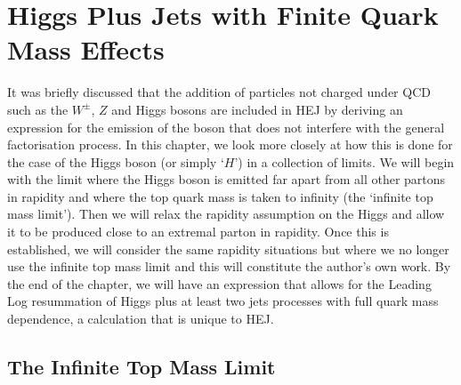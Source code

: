\chapter{Higgs Plus Jets with Finite Quark Mass Effects}


It was briefly discussed that the addition of particles not charged under QCD such as the $W^\pm$, $Z$ and Higgs bosons are included in HEJ by deriving an expression for the emission of the boson that does not interfere with the general factorisation process. In this chapter, we look more closely at how this is done for the case of the Higgs boson (or simply `$H$') in a collection of limits. We will begin with the limit where the Higgs boson is emitted far apart from all other partons in rapidity and where the top quark mass is taken to infinity (the `infinite top mass limit'). Then we will relax the rapidity assumption on the Higgs and allow it to be produced close to an extremal parton in rapidity. Once this is established, we will consider the same rapidity situations but where we no longer use the infinite top mass limit and this will constitute the author's own work. By the end of the chapter, we will have an expression that allows for the Leading Log resummation of Higgs plus at least two jets processes with full quark mass dependence, a calculation that is unique to HEJ.   
\section{The Infinite Top Mass Limit}

